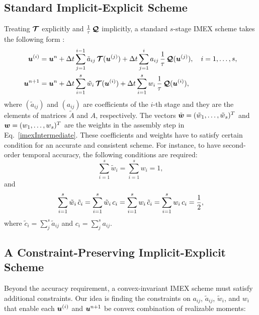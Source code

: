 \subsection{Standard Implicit-Explicit Scheme}
Treating $\boldsymbol{\mathcal{T}}$ explicitly and $\frac{1}{\tau}\,\boldsymbol{\mathcal{Q}}$ implicitly, a standard $s$-stage IMEX scheme takes the following form \cite{pareschiRusso_2005}: 
\begin{align}
  \boldsymbol{u}^{(i)}
  &=\boldsymbol{u}^{n}
  +\Delta t\sum_{j=1}^{i-1}\tilde{a}_{ij}\,\boldsymbol{\mathcal{T}}(\boldsymbol{u}^{(j)})
  +\Delta t\sum_{j=1}^{i}a_{ij}\,\frac{1}{\tau}\,\boldsymbol{\mathcal{Q}}(\boldsymbol{u}^{(j)}),
  \quad i=1,\ldots,s, \label{imexStages} \\
  \boldsymbol{u}^{n+1}
  &=\boldsymbol{u}^{n}
  +\Delta t\sum_{i=1}^{s}\tilde{w}_{i}\,\boldsymbol{\mathcal{T}}(\boldsymbol{u}^{(i)})
  +\Delta t\sum_{i=1}^{s}w_{i}\,\frac{1}{\tau}\,\boldsymbol{\mathcal{Q}}(\boldsymbol{u}^{(i)}), \label{imexIntermediate} 
\end{align}
where  $(\tilde{a}_{ij})$ and $(a_{ij})$ are coefficients of the $i$-th stage and they are the elements of matrices $\tilde{A}$ and $A$, respectively.
The vectors $\tilde{\boldsymbol{w}}=(\tilde{w}_{1},\ldots,\tilde{w}_{s})^{T}$ and $\boldsymbol{w}=(w_{1},\ldots,w_{s})^{T}$ are the weights in the assembly step in Eq.~\eqref{imexIntermediate}.
These coefficients and weights have to satisfy certain condition for an accurate and consistent scheme.
For instance, to have second-order temporal accuracy, the following conditions are required:
\begin{equation}
  \sum_{i=1}^{s}\tilde{w}_{i}=\sum_{i=1}^{s}w_{i}=1,
  \label{orderConditions1}
\end{equation}
and
\begin{equation}
  \sum_{i=1}^{s}\tilde{w}_{i}\,\tilde{c}_{i}
  =\sum_{i=1}^{s}\tilde{w}_{i}\,c_{i}
  =\sum_{i=1}^{s}w_{i}\,\tilde{c}_{i}
  =\sum_{i=1}^{s}w_{i}\,c_{i}=\frac{1}{2}, 
  \label{orderConditions2}
\end{equation}
where $\tilde{c}_{i} = \sum_{j}^{s}\tilde{a}_{ij}$ and $c_{i}=\sum_{j}^{s}a_{ij}$.

\subsection{A Constraint-Preserving Implicit-Explicit Scheme}
Beyond the accuracy requirement, a convex-invariant IMEX scheme must satisfy additional constraints.
Our idea is finding the constraints on $a_{ij}$, $\tilde{a}_{ij}$, $\tilde{w}_{i}$, and $w_{i}$ that enable each $\boldsymbol{u}^{(i)}$ and $\boldsymbol{u}^{n+1}$ be convex combination of realizable moments:

